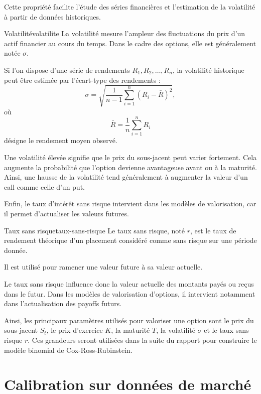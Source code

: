 \documentclass[12pt,a4paper]{report}
\begin{document}
Cette propriété facilite l'étude des séries financières et l'estimation de la volatilité à partir de données historiques.
\begin{definition}{Volatilité}{volatilite}
La volatilité mesure l'ampleur des fluctuations du prix d'un actif financier au cours du temps. Dans le cadre des options, elle est généralement notée $\sigma$.

Si l'on dispose d'une série de rendements $R_1, R_2, \ldots, R_n$, la volatilité historique peut être estimée par l'écart-type des rendements :
\[
\sigma = \sqrt{\frac{1}{n-1}\sum_{i=1}^{n}(R_i-\bar R)^2},
\]
où
\[
\bar R = \frac{1}{n}\sum_{i=1}^{n} R_i
\]
désigne le rendement moyen observé.
\end{definition}

Une volatilité élevée signifie que le prix du sous-jacent peut varier fortement. Cela augmente la probabilité que l'option devienne avantageuse avant ou à la maturité. Ainsi, une hausse de la volatilité tend généralement à augmenter la valeur d'un call comme celle d'un put.

Enfin, le taux d'intérêt sans risque intervient dans les modèles de valorisation, car il permet d'actualiser les valeurs futures.

\begin{definition}{Taux sans risque}{taux-sans-risque}
Le taux sans risque, noté $r$, est le taux de rendement théorique d'un placement considéré comme sans risque sur une période donnée.

Il est utilisé pour ramener une valeur future à sa valeur actuelle.
\end{definition}

Le taux sans risque influence donc la valeur actuelle des montants payés ou reçus dans le futur. Dans les modèles de valorisation d'options, il intervient notamment dans l'actualisation des payoffs futurs.

Ainsi, les principaux paramètres utilisés pour valoriser une option sont le prix du sous-jacent $S_t$, le prix d'exercice $K$, la maturité $T$, la volatilité $\sigma$ et le taux sans risque $r$. Ces grandeurs seront utilisées dans la suite du rapport pour construire le modèle binomial de Cox-Ross-Rubinstein.


\chapter{Calibration sur données de marché}
\end{document}
